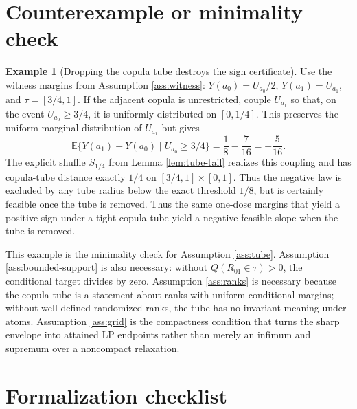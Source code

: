 \documentclass[11pt]{article}
\newcommand{\E}{\mathbb{E}}
\theoremstyle{definition}
\newtheorem{example}{Example}
\theoremstyle{plain}
\theoremstyle{remark}
\begin{document}
\section{Counterexample or minimality check}
\begin{example}[Dropping the copula tube destroys the sign certificate]\label{ex:no-tube-counterexample}
Use the witness margins from Assumption \ref{ass:witness}: \(Y(a_0)=U_{a_0}/2\), \(Y(a_1)=U_{a_1}\), and \(\tau=[3/4,1]\).  If the adjacent copula is unrestricted, couple \(U_{a_1}\) so that, on the event \(U_{a_0}\ge3/4\), it is uniformly distributed on \([0,1/4]\).  This preserves the uniform marginal distribution of \(U_{a_1}\) but gives
\[
\E\{Y(a_1)-Y(a_0)\mid U_{a_0}\ge3/4\}
=\frac18-\frac{7}{16}
=-\frac{5}{16}.
\]
The explicit shuffle \(S_{1/4}\) from Lemma \ref{lem:tube-tail} realizes this coupling and has copula-tube distance exactly \(1/4\) on \([3/4,1]\times[0,1]\).  Thus the negative law is excluded by any tube radius below the exact threshold \(1/8\), but is certainly feasible once the tube is removed.
Thus the same one-dose margins that yield a positive sign under a tight copula tube yield a negative feasible slope when the tube is removed.
\end{example}

This example is the minimality check for Assumption \ref{ass:tube}.  Assumption \ref{ass:bounded-support} is also necessary: without \(Q(R_{01}\in\tau)>0\), the conditional target divides by zero.  Assumption \ref{ass:ranks} is necessary because the copula tube is a statement about ranks with uniform conditional margins; without well-defined randomized ranks, the tube has no invariant meaning under atoms.  Assumption \ref{ass:grid} is the compactness condition that turns the sharp envelope into attained LP endpoints rather than merely an infimum and supremum over a noncompact relaxation.

\section{Formalization checklist}
\end{document}
